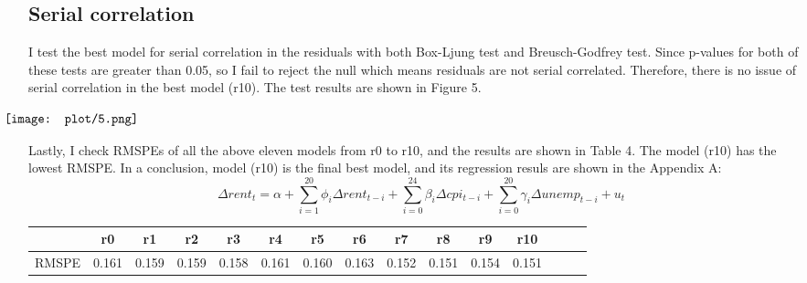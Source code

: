 \documentclass[12pt, times]{article}
\renewcommand{\baselinestretch}{1.5}
\begin{document}
\subsection{Serial correlation}
I test the best model for serial correlation in the residuals with both Box-Ljung test and Breusch-Godfrey test. Since p-values for both of these tests are greater than 0.05, so I fail to reject the null which means residuals are not serial correlated. Therefore, there is no issue of serial correlation in the best model (r10). The test results are shown in Figure 5.
\begin{figure}[H]
\begin{center}
$
\begin{array}
[c]{cc}%
\makebox[0pt]{\texttt{[image: plot/5.png]}}
\end{array}
$
\end{center}
\vspace{-1.5em}
\caption{}
\end{figure}
\vspace{-1.5em}
Lastly, I check RMSPEs of all the above eleven models from r0 to r10, and the results are shown in Table 4. The model (r10) has the lowest RMSPE. In a conclusion, model (r10) is the final best model, and its regression resuls are shown in the Appendix A:
\begin{equation}
\Delta rent_t = \alpha + \sum_{i=1}^{20} \phi_i \Delta rent_{t-i} + \sum_{i=0}^{24} \beta_i \Delta cpi_{t-i} + \sum_{i=0}^{20} \gamma_i \Delta unemp_{t-i} + u_t
\end{equation}

\renewcommand{\baselinestretch}{0.5}
  \begin{scriptsize}
  \begin{center}
  \tabcolsep 10pt
    \begin{tabular}{lcccccccccccccc}
    \toprule
           & r0 & r1 & r2 & r3 & r4 & r5 & r6 & r7 & r8 & r9 & r10\\
\midrule
RMSPE      & 0.161	& 0.159 & 0.159 & 0.158 & 0.161 & 0.160 & 0.163 & 0.152 & 0.151 & 0.154 & 0.151\\
\bottomrule													
    \end{tabular}
    \end{center}
  \end{scriptsize}
\end{document}
